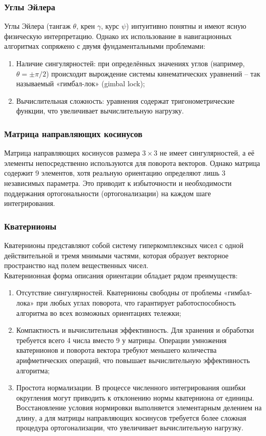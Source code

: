 \subsubsection{Углы Эйлера}
Углы Эйлера (тангаж $\theta$, крен $\gamma$, курс $\psi$) интуитивно понятны и имеют ясную физическую интерпретацию. Однако их использование в навигационных алгоритмах сопряжено с двумя фундаментальными проблемами:

\begin{enumerate}[label=\arabic*]
	\item Наличие сингулярностей: при определённых значениях углов (например, $\theta = \pm \pi / 2$) происходит вырождение системы кинематических уравнений – так называемый «гимбал-лок» (gimbal lock);
	\item Вычислительная сложность: уравнения содержат тригонометрические функции, что увеличивает вычислительную нагрузку.
\end{enumerate}


\subsubsection{Матрица направляющих косинусов}
Матрица направляющих косинусов размера $3 \times 3$ не имеет сингулярностей, а её элементы непосредственно используются для поворота векторов. Однако матрица содержит 9 элементов, хотя реальную ориентацию определяют лишь 3 независимых параметра. Это приводит к избыточности и необходимости поддержания ортогональности (ортогонализации) на каждом шаге интегрирования.


\subsubsection{Кватернионы}
Кватернионы представляют собой систему гиперкомплексных чисел с одной действительной и тремя мнимыми частями, которая образует векторное пространство над полем вещественных чисел.\\

Кватернионная форма описания ориентации обладает рядом преимуществ:
\begin{enumerate}
	\item Отсутствие сингулярностей. Кватернионы свободны от проблемы «гимбал-лока» при любых углах поворота, что гарантирует работоспособность алгоритма во всех возможных ориентациях тележки;
	\item Компактность и вычислительная эффективность. Для хранения и обработки требуется всего 4 числа вместо 9 у матрицы. Операции умножения кватернионов и поворота вектора требуют меньшего количества арифметических операций, что повышает вычислительную эффективность алгоритма;
	\item Простота нормализации. В процессе численного интегрирования ошибки округления могут приводить к отклонению нормы кватерниона от единицы. Восстановление условия нормировки выполняется элементарным делением на длину, а для матрицы направляющих косинусов требуется более сложная процедура ортогонализации, что увеличивает вычислительную нагрузку.
\end{enumerate}


